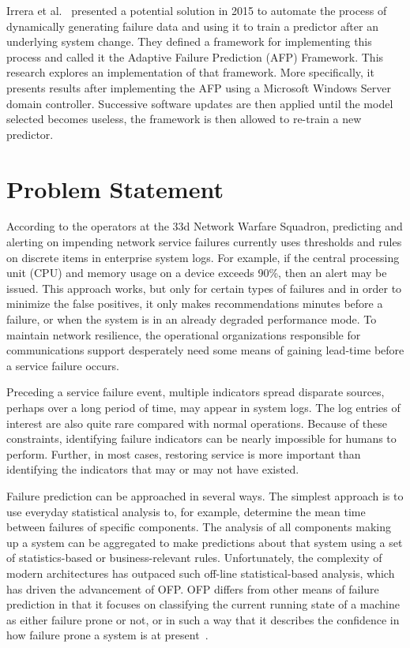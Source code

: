Irrera et al.~\cite{irrera2015} presented a potential solution in 2015 to
automate the process of dynamically generating failure data and using it to
train a predictor after an underlying system change.  They defined a framework
for implementing this process and called it the Adaptive Failure Prediction
(AFP) Framework.  This research explores an implementation of that framework.
More specifically, it presents results after implementing the AFP using a
Microsoft Windows Server domain controller.  Successive software updates are
then applied until the model selected becomes useless, the framework is then
allowed to re-train a new predictor.

\section{Problem Statement}
According to the operators at the 33d Network Warfare Squadron, predicting and
alerting on impending network service failures currently uses thresholds and
rules on discrete items in enterprise system logs.  For example, if the central
processing unit (CPU) and memory usage on a device exceeds 90\%, then an alert
may be issued.  This approach works, but only for certain types of failures and
in order to minimize the false positives, it only makes recommendations minutes
before a failure, or when the system is in an already degraded performance
mode.  To maintain network resilience, the operational organizations
responsible for communications support desperately need some means of gaining
lead-time before a service failure occurs.  

Preceding a service failure event, multiple indicators spread disparate
sources, perhaps over a long period of time, may appear in system logs.  The
log entries of interest are also quite rare compared with normal operations.
Because of these constraints, identifying failure indicators can be nearly
impossible for humans to perform.  Further, in most cases, restoring service is
more important than identifying the indicators that may or may not have
existed.  

Failure prediction can be approached in several ways. The simplest approach is
to use everyday statistical analysis to, for example, determine the mean time
between failures of specific components. The analysis of all components making
up a system can be aggregated to make predictions about that system using a set
of statistics-based or business-relevant rules.  Unfortunately, the complexity
of modern architectures has outpaced such off-line statistical-based analysis,
which has driven the advancement of OFP.  OFP differs from other means of
failure prediction in that it focuses on classifying the current running state
of a machine as either failure prone or not, or in such a way that it describes
the confidence in how failure prone a system is at
present~\cite{salfnerSurvey}.

